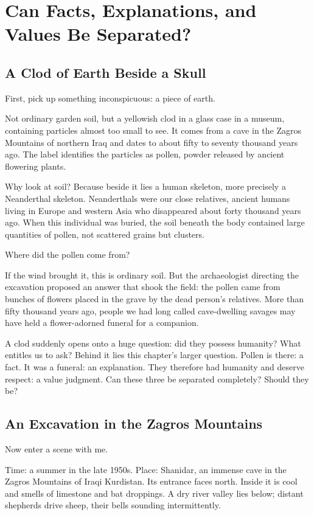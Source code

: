 \chapter[Facts, Explanations, and Values]{Can Facts, Explanations, and Values Be Separated?}
\section{A Clod of Earth Beside a Skull}
First, pick up something inconspicuous: a piece of earth.

Not ordinary garden soil, but a yellowish clod in a glass case in a museum, containing particles almost too small to see. It comes from a cave in the Zagros Mountains of northern Iraq and dates to about fifty to seventy thousand years ago. The label identifies the particles as pollen, powder released by ancient flowering plants.

Why look at soil? Because beside it lies a human skeleton, more precisely a Neanderthal skeleton. Neanderthals were our close relatives, ancient humans living in Europe and western Asia who disappeared about forty thousand years ago. When this individual was buried, the soil beneath the body contained large quantities of pollen, not scattered grains but clusters.

Where did the pollen come from?

If the wind brought it, this is ordinary soil. But the archaeologist directing the excavation proposed an answer that shook the field: the pollen came from bunches of flowers placed in the grave by the dead person's relatives. More than fifty thousand years ago, people we had long called cave-dwelling savages may have held a flower-adorned funeral for a companion.

A clod suddenly opens onto a huge question: did they possess humanity? What entitles us to ask? Behind it lies this chapter's larger question. Pollen is there: a fact. It was a funeral: an explanation. They therefore had humanity and deserve respect: a value judgment. Can these three be separated completely? Should they be?

\section{An Excavation in the Zagros Mountains}
Now enter a scene with me.

Time: a summer in the late 1950s. Place: Shanidar, an immense cave in the Zagros Mountains of Iraqi Kurdistan. Its entrance faces north. Inside it is cool and smells of limestone and bat droppings. A dry river valley lies below; distant shepherds drive sheep, their bells sounding intermittently.

